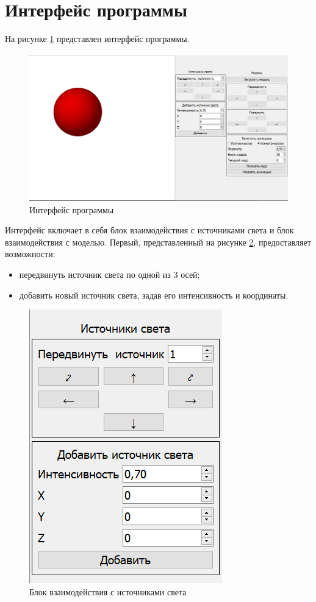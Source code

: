\section{Интерфейс программы}
На рисунке \ref{fig:wholeinterface} представлен интерфейс программы.
\begin{figure}[H]
	\centering
	\includegraphics[width=0.9\linewidth]{images/whole_interface}
	\caption{Интерфейс программы}
	\label{fig:wholeinterface}
\end{figure}
Интерфейс включает в себя блок взаимодействия с источниками света и блок взаимодействия с моделью. Первый, представленный на рисунке \ref{fig:lights}, предоставляет возможности:
\begin{itemize}
	\item передвинуть источник света по одной из 3 осей;
	\item добавить новый источник света, задав его интенсивность и координаты.
\end{itemize}
\begin{figure}[H]
	\centering
	\includegraphics[width=0.4\linewidth]{images/lights}
	\caption{Блок взаимодействия с источниками света}
	\label{fig:lights}
\end{figure}

